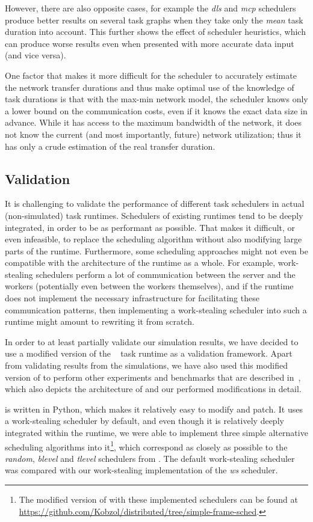 However, there are also opposite cases, for example the \emph{dls} and
\emph{mcp} schedulers produce better results on several task graphs when they take
only the \emph{mean} task duration into account. This further shows the effect of
scheduler heuristics, which can produce worse results even when presented with more accurate data
input (and vice versa).

One factor that makes it more difficult for the scheduler to accurately estimate the network
transfer durations and thus make optimal use of the knowledge of task durations is that with the
max-min network model, the scheduler knows only a lower bound on the communication costs, even if
it knows the exact data size in advance. While it has access to the maximum bandwidth of the
network, it does not know the current (and most importantly, future) network utilization; thus it
has only a crude estimation of the real transfer duration.

\subsection{Validation}
It is challenging to validate the performance of different task schedulers in actual
(non-simulated) task runtimes. Schedulers of existing runtimes tend to be deeply integrated, in
order to be as performant as possible. That makes it difficult, or even infeasible, to replace the
scheduling algorithm without also modifying large parts of the runtime. Furthermore, some
scheduling approaches might not even be compatible with the architecture of the runtime as a whole.
For example, work-stealing schedulers perform a lot of communication between the server and the
workers (potentially even between the workers themselves), and if the runtime does not implement
the necessary infrastructure for facilitating these communication patterns, then implementing a
work-stealing scheduler into such a runtime might amount to rewriting it from scratch.

In order to at least partially validate our simulation results, we have decided to use a modified
version of the \dask{}~\cite{dask} task runtime as a validation
framework. Apart from validating results from the \estee{} simulations, we have also
used this modified version of \dask{} to perform other experiments and benchmarks
that are described in~, which also depicts the architecture of
\dask{} and our performed modifications in detail.

\dask{} is written in Python, which makes it relatively easy to modify and patch.
It uses a work-stealing scheduler by default, and even though it is relatively deeply integrated
within the \dask{} runtime, we were able to implement three simple alternative
scheduling algorithms into it\footnote{The modified version of \dask{} with these implemented schedulers can be found at
\url{https://github.com/Kobzol/distributed/tree/simple-frame-sched}.}, which correspond as closely as possible to
the \emph{random}, \emph{blevel} and \emph{tlevel} schedulers from
\estee{}. The default work-stealing scheduler was compared with our work-stealing
implementation of the \emph{ws} scheduler.

